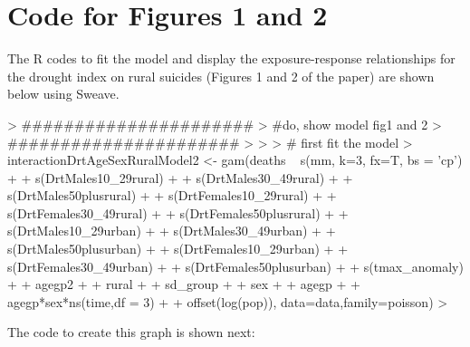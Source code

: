 \documentclass[a4paper]{article}                %
\begin{document}

\singlespace
        \clearpage
        \section{Code for Figures 1 and 2}
        The R codes to fit the model and display the exposure-response relationships for the drought index on rural suicides (Figures 1 and 2 of the paper) are shown below using Sweave.

\begin{Schunk}
\begin{Sinput}
> ######################
> #do,  show model fig1 and 2
> ######################
> 
> 
> # first fit the model
>         interactionDrtAgeSexRuralModel2 <- gam(deaths ~  s(mm, k=3, fx=T, bs = 'cp')
+         + s(DrtMales10_29rural)
+         + s(DrtMales30_49rural)
+         + s(DrtMales50plusrural)
+         + s(DrtFemales10_29rural)
+         + s(DrtFemales30_49rural)
+         + s(DrtFemales50plusrural)
+         + s(DrtMales10_29urban)
+         + s(DrtMales30_49urban)
+         + s(DrtMales50plusurban)
+         + s(DrtFemales10_29urban)
+         + s(DrtFemales30_49urban)
+         + s(DrtFemales50plusurban)
+         + s(tmax_anomaly)
+         + agegp2
+         + rural
+         + sd_group
+         + sex
+         + agegp
+         + agegp*sex*ns(time,df = 3)
+         + offset(log(pop)), data=data,family=poisson)
> 
\end{Sinput}
\end{Schunk}




        \clearpage
        The code to create this graph is shown next:
\end{document}
